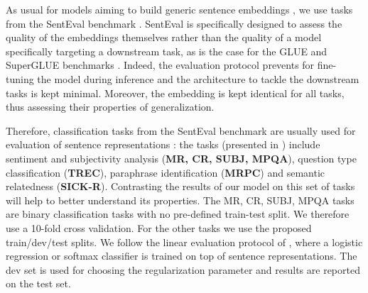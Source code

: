 As usual for models aiming to build generic sentence embeddings \textcite{kiros_15, hill_16, arora_17, conneau_17, logeswaran_18, nie_19}, we use tasks from the SentEval benchmark \parencite{conneau_18}. SentEval is specifically designed to assess the quality of the embeddings themselves rather than the quality of a model specifically targeting a downstream task, as is the case for the GLUE and SuperGLUE benchmarks \parencite{wang_19_glue, wang_19_superglue}. Indeed, the evaluation protocol prevents for fine-tuning the model during inference and the architecture to tackle the downstream tasks is kept minimal. Moreover, the embedding is kept identical for all tasks, thus assessing their properties of generalization. 

Therefore, classification tasks from the SentEval benchmark are usually used for evaluation of sentence representations \parencite{conneau_18}: the tasks (presented in ) include sentiment and subjectivity analysis (\textbf{MR, CR, SUBJ, MPQA}), question type classification (\textbf{TREC}), paraphrase identification (\textbf{MRPC}) and semantic relatedness (\textbf{SICK-R}). Contrasting the results of our model on this set of tasks will help to better understand its properties.  The MR, CR, SUBJ, MPQA tasks are binary classification tasks with no pre-defined train-test split. We therefore use a 10-fold cross validation. For the other tasks we use the proposed train/dev/test splits.
We follow the linear evaluation protocol of \textcite{kiros_15}, where a logistic regression or softmax classifier is trained on top of sentence representations. The dev set is used for choosing the regularization parameter and results are reported on the test set. 


